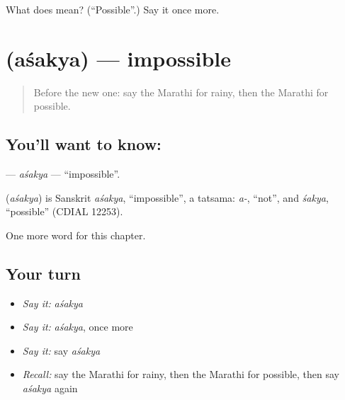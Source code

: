 \begin{tcolorbox}[breakable,colback=teal!4,colframe=teal!35!black,title={Before you move on}]
What does  mean? (\textquotedblleft{}Possible\textquotedblright{}.) Say it once more.
\end{tcolorbox}
\section[\texorpdfstring{\mr{अशक्य} (aśakya)}{अशक्य (aśakya)}]{ (aśakya) — impossible}

\label{lesson:MR-C176-asakya}



\begin{quote}
Before the new one: say the Marathi for rainy, then the Marathi for possible.
\end{quote}

\subsection*{You'll want to know: }
\textbf{} — \emph{aśakya} — \textquotedblleft{}impossible\textquotedblright{}.

\begin{cousinweb}
\textbf{} (\emph{aśakya}) is Sanskrit \emph{aśakya}, \textquotedblleft{}impossible\textquotedblright{}, a tatsama: \emph{a-}, \textquotedblleft{}not\textquotedblright{}, and \emph{śakya}, \textquotedblleft{}possible\textquotedblright{} (CDIAL 12253).
\end{cousinweb}

\begin{grammarlens}[title={What you've built}]
One more word for this chapter.
\end{grammarlens}

\subsection*{Your turn}
\begin{itemize}
\raggedright
  \item \emph{Say it:} \emph{aśakya}
  \item \emph{Say it:} \emph{aśakya}, once more
  \item \emph{Say it:} say \emph{aśakya}
  \item \emph{Recall:} say the Marathi for rainy, then the Marathi for possible, then say \emph{aśakya} again
\end{itemize}

